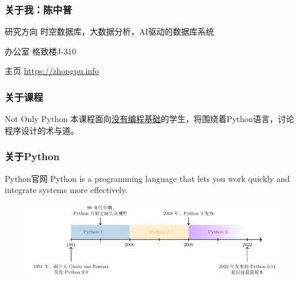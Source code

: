 \documentclass[aspectratio=169, 14pt]{beamer}
\begin{document}
\begin{frame}
	\frametitle{关于我：陈中普}

	\begin{block}{ 研究方向}
		时空数据库，大数据分析，AI驱动的数据库系统
	\end{block}

	\begin{block}{ 办公室}
		格致楼J-310
	\end{block}

	\begin{block}{ 主页}
		\href{https://zhongpu.info}{https://zhongpu.info}
	\end{block}

\end{frame}
\begin{frame}
	\frametitle{关于课程}
	\begin{block}{Not Only Python}
		本课程面向\underline{没有编程基础}的学生，将围绕着Python语言，讨论程序设计的\alert{术}与\alert{道}。
	\end{block}
\end{frame}

\begin{frame}
	\frametitle{关于Python}
	\begin{block}{Python官网}
		Python is a programming language that lets you work quickly and integrate systems more effectively.
	\end{block}

	\begin{figure}
		\center
		\includegraphics[height=.45\paperheight]{week1/Timeline.pdf}
	\end{figure}
\end{frame}
\end{document}
